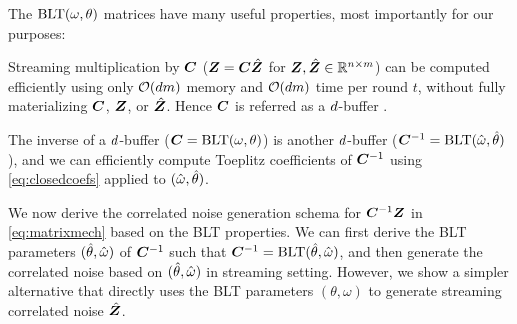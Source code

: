 The $\text{BLT}(\omega, \theta)$ matrices have many useful properties, most importantly for our purposes:
\begin{enumerate*}[label=\color{purple}(\arabic*)]
    \item Streaming multiplication by ${\bm{C}}$ (${\bm{Z}} = {\bm{C}} \hat{{\bm{Z}}}$ for ${\bm{Z}},\hat{{\bm{Z}}} \in \mathbb{R}^{n \times m}$) can be computed efficiently using only $\mathcal{O}(d m)$ memory and $\mathcal{O}(d m)$ time per round $t$, without fully materializing ${\bm{C}}$, ${\bm{Z}}$, or $\hat{{\bm{Z}}}$. Hence ${\bm{C}}$ is referred as a $d$-buffer \blt.
    \item The inverse of a $d$-buffer \blt (${\bm{C}} = \text{BLT}(\omega, \theta)$) is another $d$-buffer \blt (${\bm{C}}^{-1} = \text{BLT}(\hat{\omega}, \hat{\theta})$), and we can efficiently compute Toeplitz coefficients of ${\bm{C}}^{-1}$ using \cref{eq:closedcoefs} applied to $(\hat{\omega}, \hat{\theta})$.
\end{enumerate*}
We now derive the correlated noise generation schema for ${\bm{C}}^{-1}{\bm{Z}}$ in \cref{eq:matrixmech} based on the BLT properties. We can first derive the BLT parameters $(\hat{\theta}, \hat{\omega})$ of ${\bm{C}}^{-1}$ such that ${\bm{C}}^{-1} = \text{BLT}(\hat{\theta}, \hat{\omega})$, and then generate the correlated noise based on $(\hat{\theta}, \hat{\omega})$ in streaming setting. However, we show a simpler alternative that directly uses the BLT parameters $(\theta, \omega)$ to generate streaming correlated noise $\hat{{\bm{Z}}}$. 

